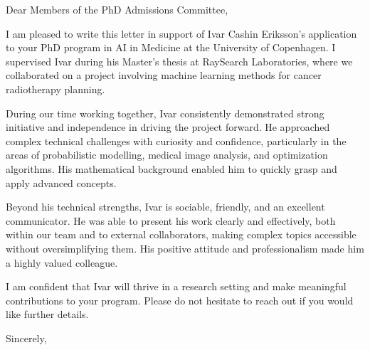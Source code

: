 \documentclass[11pt,a4paper]{letter}
\date{\today}
\begin{document}
\begin{letter}{}

\opening{Dear Members of the PhD Admissions Committee,}

I am pleased to write this letter in support of Ivar Cashin Eriksson's application to your PhD program in AI in Medicine at the University of Copenhagen. I supervised Ivar during his Master's thesis at RaySearch Laboratories, where we collaborated on a project involving machine learning methods for cancer radiotherapy planning.

During our time working together, Ivar consistently demonstrated strong initiative and independence in driving the project forward. He approached complex technical challenges with curiosity and confidence, particularly in the areas of probabilistic modelling, medical image analysis, and optimization algorithms. His mathematical background enabled him to quickly grasp and apply advanced concepts.

Beyond his technical strengths, Ivar is sociable, friendly, and an excellent communicator. He was able to present his work clearly and effectively, both within our team and to external collaborators, making complex topics accessible without oversimplifying them. His positive attitude and professionalism made him a highly valued colleague.

I am confident that Ivar will thrive in a research setting and make meaningful contributions to your program. Please do not hesitate to reach out if you would like further details.

\closing{Sincerely,}

\end{letter}
\end{document}
